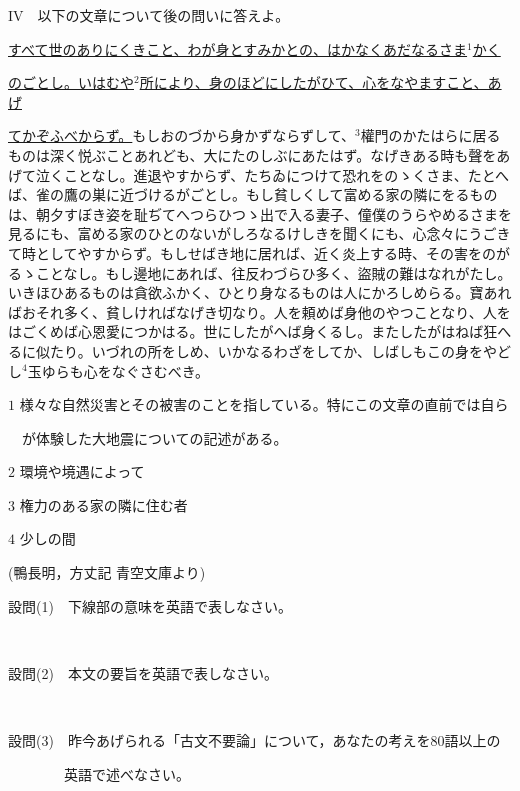 \documentclass[12pt,a4paper,dvipdfmx]{jarticle}
\begin{document}
\begin{spacing}{1.5}
\newpage

{\Large\textbf{$\mathrm{IV}$}}　以下の文章について後の問いに答えよ。


\vspace{7mm}

\underline{すべて世のありにくきこと、わが身とすみかとの、はかなくあだなるさま$^{1}$かく}

\hspace{-4mm}
\underline{のごとし。いはむや$^{2}$所により、身のほどにしたがひて、心をなやますこと、あげ}

\hspace{-4mm}
\underline{てかぞふべからず。}もしおのづから身かずならずして、$^{3}$權門のかたはらに居るものは深く悦ぶことあれども、大にたのしぶにあたはず。なげきある時も聲をあげて泣くことなし。進退やすからず、たちゐにつけて恐れをのゝくさま、たとへば、雀の鷹の巣に近づけるがごとし。もし貧しくして富める家の隣にをるものは、朝夕すぼき姿を耻ぢてへつらひつゝ出で入る妻子、僮僕のうらやめるさまを見るにも、富める家のひとのないがしろなるけしきを聞くにも、心念々にうごきて時としてやすからず。もしせばき地に居れば、近く炎上する時、その害をのがるゝことなし。もし邊地にあれば、往反わづらひ多く、盜賊の難はなれがたし。いきほひあるものは貪欲ふかく、ひとり身なるものは人にかろしめらる。寶あればおそれ多く、貧しければなげき切なり。人を頼めば身他のやつことなり、人をはごくめば心恩愛につかはる。世にしたがへば身くるし。またしたがはねば狂へるに似たり。いづれの所をしめ、いかなるわざをしてか、しばしもこの身をやどし$^{4}$玉ゆらも心をなぐさむべき。

\vspace{7mm}

$1$ 様々な自然災害とその被害のことを指している。特にこの文章の直前では自ら

　が体験した大地震についての記述がある。

$2$ 環境や境遇によって

$3$ 権力のある家の隣に住む者

$4$ 少しの間

\vspace{-5mm}\begin{center}
(鴨長明，方丈記 青空文庫より)
\end{center}\vspace{-5mm}

\newpage

設問(1)　下線部の意味を英語で表しなさい。

\

設問(2)　本文の要旨を英語で表しなさい。

\

設問(3)　昨今あげられる「古文不要論」について，あなたの考えを80語以上の

　　　　英語で述べなさい。

\end{spacing}
\end{document}
